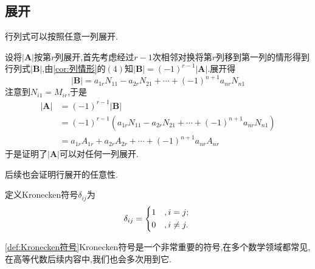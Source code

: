 \subsection{展开}
\begin{formal}
\begin{proposition}[任意展开]\label{prop:任意展开}
    行列式可以按照任意一列展开.
\end{proposition}
\begin{Proof}
设将$\left|\bm{A}\right|$按第$r$列展开,首先考虑经过$r-1$次相邻对换将第$r$列移到第一列的情形得到行列式$\left|\bm{B}\right|$,由\cref{cor:列情形}的$(4)$知$\left|\bm{B}\right|=\left(-1\right)^{r-1}\left|\bm{A}\right|.$展开得\[
\left|\bm{B}\right|=a_{1r}N_{11}-a_{2r}N_{21}+\cdots+(-1)^{n+1}a_{nr}N_{n1}
\]注意到$N_{i1}=M_{ir}$,于是
\begin{align*}
    \left|\bm{A}\right|&=\left(-1\right)^{r-1}\left|\bm{B}\right|\\
    &=\left(-1\right)^{r-1}\left(a_{1r}N_{11}-a_{2r}N_{21}+\cdots+(-1)^{n+1}a_{nr}N_{n1}\right)\\
    &=a_{1r}A_{1r}+a_{2r}A_{2r}+\cdots+(-1)^{n+1}a_{nr}A_{nr}
\end{align*}于是证明了$\left|\bm{A}\right|$可以对任何一列展开.
\end{Proof}
\end{formal}
\begin{red}
    \begin{remark}
        后续也会证明行展开的任意性.
    \end{remark}
\end{red}
\begin{formal}
\begin{definition}[Kronecken符号]\label{def:Kronecken符号}
    定义\textup{Kronecken符号}$\delta_{ij}$为\[
    \delta_{ij}=
    \begin{cases*}
        1 &$,i=j;$\\
        0 &$,i\neq j.$
    \end{cases*}
    \]
\end{definition}
\end{formal}
\begin{red}
    \begin{remark}
        \cref{def:Kronecken符号}\textup{Kronecken符号}是一个非常重要的符号,在多个数学领域都常见,在高等代数后续内容中,我们也会多次用到它.
    \end{remark}
\end{red}
\vfill
